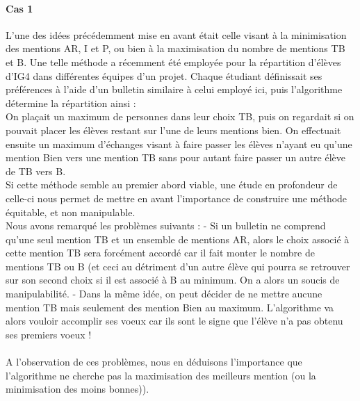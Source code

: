 \documentclass[10pt,a4paper]{scrartcl}
\begin{document}
\paragraph{Cas 1}
L'une des idées précédemment mise en avant était celle visant à la minimisation des mentions AR, I et P, ou bien  à la maximisation du nombre de mentions TB et B.
Une telle méthode a récemment été employée pour la répartition d'élèves d'IG4 dans différentes équipes d'un projet. Chaque étudiant définissait ses préférences à l'aide d'un bulletin similaire à celui employé ici, puis l'algorithme détermine la répartition ainsi :\\
On plaçait un maximum de personnes dans leur choix TB, puis on regardait si on pouvait placer les élèves restant sur l'une de leurs mentions bien. On effectuait ensuite un maximum d'échanges visant à faire passer les élèves n'ayant eu qu'une mention Bien vers une mention TB sans pour autant faire passer un autre élève de TB vers B.\\
Si cette méthode semble au premier abord viable, une étude en profondeur de celle-ci nous permet de mettre en avant l'importance de construire une méthode équitable, et non manipulable.\\
Nous avons remarqué les problèmes suivants : 
- Si un bulletin ne comprend qu'une seul mention TB et un ensemble de mentions AR, alors le choix associé à cette mention TB sera forcément accordé car il fait monter le nombre de mentions TB ou B (et ceci au détriment d'un autre élève qui pourra se retrouver sur son second choix si il est associé à B au minimum. On a alors un soucis de manipulabilité.
- Dans la même idée, on peut décider de ne mettre aucune mention TB mais seulement des mention Bien au maximum. L'algorithme va alors vouloir accomplir ses voeux car ils sont le signe que l'élève n'a pas obtenu ses premiers voeux !\\
\\
A l'observation de ces problèmes, nous en déduisons l'importance que l'algorithme ne cherche pas la maximisation des meilleurs mention (ou la minimisation des moins bonnes)).
\end{document}
